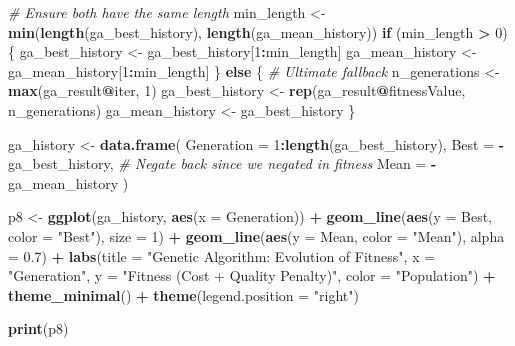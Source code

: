 \documentclass[
]{article}
\newenvironment{Shaded}{\begin{snugshade}}{\end{snugshade}}
\newcommand{\AttributeTok}[1]{\textcolor[rgb]{0.13,0.29,0.53}{#1}}
\newcommand{\CommentTok}[1]{\textcolor[rgb]{0.56,0.35,0.01}{\textit{#1}}}
\newcommand{\ControlFlowTok}[1]{\textcolor[rgb]{0.13,0.29,0.53}{\textbf{#1}}}
\newcommand{\DecValTok}[1]{\textcolor[rgb]{0.00,0.00,0.81}{#1}}
\newcommand{\FloatTok}[1]{\textcolor[rgb]{0.00,0.00,0.81}{#1}}
\newcommand{\FunctionTok}[1]{\textcolor[rgb]{0.13,0.29,0.53}{\textbf{#1}}}
\newcommand{\NormalTok}[1]{#1}
\newcommand{\OtherTok}[1]{\textcolor[rgb]{0.56,0.35,0.01}{#1}}
\newcommand{\SpecialCharTok}[1]{\textcolor[rgb]{0.81,0.36,0.00}{\textbf{#1}}}
\newcommand{\StringTok}[1]{\textcolor[rgb]{0.31,0.60,0.02}{#1}}
\begin{document}
\begin{Shaded}
\begin{Highlighting}[]
\CommentTok{\# Ensure both have the same length}
\NormalTok{min\_length }\OtherTok{\textless{}{-}} \FunctionTok{min}\NormalTok{(}\FunctionTok{length}\NormalTok{(ga\_best\_history), }\FunctionTok{length}\NormalTok{(ga\_mean\_history))}
\ControlFlowTok{if}\NormalTok{ (min\_length }\SpecialCharTok{\textgreater{}} \DecValTok{0}\NormalTok{) \{}
\NormalTok{  ga\_best\_history }\OtherTok{\textless{}{-}}\NormalTok{ ga\_best\_history[}\DecValTok{1}\SpecialCharTok{:}\NormalTok{min\_length]}
\NormalTok{  ga\_mean\_history }\OtherTok{\textless{}{-}}\NormalTok{ ga\_mean\_history[}\DecValTok{1}\SpecialCharTok{:}\NormalTok{min\_length]}
\NormalTok{\} }\ControlFlowTok{else}\NormalTok{ \{}
  \CommentTok{\# Ultimate fallback}
\NormalTok{  n\_generations }\OtherTok{\textless{}{-}} \FunctionTok{max}\NormalTok{(ga\_result}\SpecialCharTok{@}\NormalTok{iter, }\DecValTok{1}\NormalTok{)}
\NormalTok{  ga\_best\_history }\OtherTok{\textless{}{-}} \FunctionTok{rep}\NormalTok{(ga\_result}\SpecialCharTok{@}\NormalTok{fitnessValue, n\_generations)}
\NormalTok{  ga\_mean\_history }\OtherTok{\textless{}{-}}\NormalTok{ ga\_best\_history}
\NormalTok{\}}

\NormalTok{ga\_history }\OtherTok{\textless{}{-}} \FunctionTok{data.frame}\NormalTok{(}
  \AttributeTok{Generation =} \DecValTok{1}\SpecialCharTok{:}\FunctionTok{length}\NormalTok{(ga\_best\_history),}
  \AttributeTok{Best =} \SpecialCharTok{{-}}\NormalTok{ga\_best\_history,  }\CommentTok{\# Negate back since we negated in fitness}
  \AttributeTok{Mean =} \SpecialCharTok{{-}}\NormalTok{ga\_mean\_history}
\NormalTok{)}

\NormalTok{p8 }\OtherTok{\textless{}{-}} \FunctionTok{ggplot}\NormalTok{(ga\_history, }\FunctionTok{aes}\NormalTok{(}\AttributeTok{x =}\NormalTok{ Generation)) }\SpecialCharTok{+}
  \FunctionTok{geom\_line}\NormalTok{(}\FunctionTok{aes}\NormalTok{(}\AttributeTok{y =}\NormalTok{ Best, }\AttributeTok{color =} \StringTok{"Best"}\NormalTok{), }\AttributeTok{size =} \DecValTok{1}\NormalTok{) }\SpecialCharTok{+}
  \FunctionTok{geom\_line}\NormalTok{(}\FunctionTok{aes}\NormalTok{(}\AttributeTok{y =}\NormalTok{ Mean, }\AttributeTok{color =} \StringTok{"Mean"}\NormalTok{), }\AttributeTok{alpha =} \FloatTok{0.7}\NormalTok{) }\SpecialCharTok{+}
  \FunctionTok{labs}\NormalTok{(}\AttributeTok{title =} \StringTok{"Genetic Algorithm: Evolution of Fitness"}\NormalTok{,}
       \AttributeTok{x =} \StringTok{"Generation"}\NormalTok{, }\AttributeTok{y =} \StringTok{"Fitness (Cost + Quality Penalty)"}\NormalTok{, }
       \AttributeTok{color =} \StringTok{"Population"}\NormalTok{) }\SpecialCharTok{+}
  \FunctionTok{theme\_minimal}\NormalTok{() }\SpecialCharTok{+}
  \FunctionTok{theme}\NormalTok{(}\AttributeTok{legend.position =} \StringTok{"right"}\NormalTok{)}

\FunctionTok{print}\NormalTok{(p8)}
\end{Highlighting}
\end{Shaded}
\end{document}
